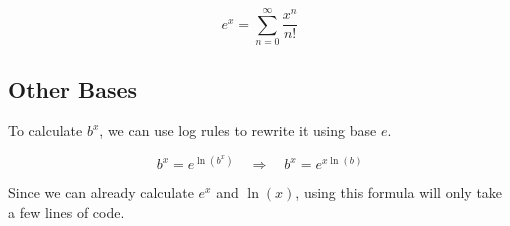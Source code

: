 \documentclass[12pt, letterpaper]{article}
\begin{document}
\[ e^x = \sum_{n=0}^{\infty}\frac{x^n}{n!} \]

\subsection{Other Bases}

To calculate $b^x$, we can use log rules to rewrite it using base $e$.

\[ b^x = e^{\ln(b^x)} \quad \Rightarrow \quad b^x = e^{x\ln(b)} \]

Since we can already calculate $e^x$ and $\ln(x)$, using this formula will only take a few lines of code.
\end{document}
